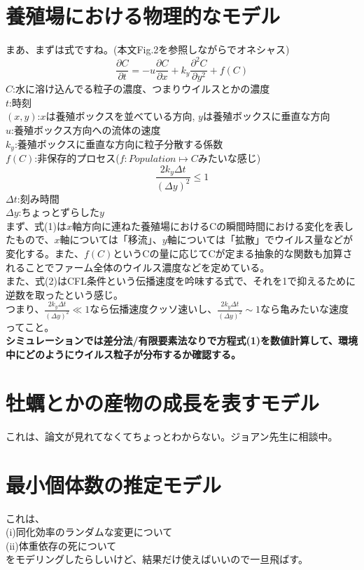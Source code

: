 \documentclass{article}
\begin{document}
\section{養殖場における物理的なモデル}
まあ、まずは式ですね。(本文Fig.2を参照しながらでオネシャス)\\
\begin{equation}
    \frac{\partial C}{\partial t} = -u \frac{\partial C}{\partial x}+k_y\frac{\partial^2 C}{\partial y^2}+f(C)
\end{equation}
$C$:水に溶け込んでる粒子の濃度、つまりウイルスとかの濃度\\
$t$:時刻\\
$(x, y)$:$x$は養殖ボックスを並べている方向, $y$は養殖ボックスに垂直な方向\\
$u$:養殖ボックス方向への流体の速度\\
$k_y$:養殖ボックスに垂直な方向に粒子分散する係数\\
$f(C)$:非保存的プロセス($f:Population\mapsto C$みたいな感じ)\\
\begin{equation}
    \frac{2k_y\Delta t}{(\Delta y)^2}\leq 1
\end{equation}
$\Delta t$:刻み時間\\
$\Delta y$:ちょっとずらした$y$\\
まず、式(1)は$x$軸方向に連ねた養殖場におけるCの瞬間時間における変化を表したもので、$x$軸については「移流」、$y$軸については「拡散」でウイルス量などが変化する。また、$f(C)$というCの量に応じてCが定まる抽象的な関数も加算されることでファーム全体のウイルス濃度などを定めている。\\
また、式(2)はCFL条件という伝播速度を吟味する式で、それを1で抑えるために逆数を取ったという感じ。\\
つまり、$\frac{2k_y\Delta t}{(\Delta y)^2} \ll 1$なら伝播速度クッソ速いし、$\frac{2k_y\Delta t}{(\Delta y)^2} \sim 1$なら亀みたいな速度ってこと。\\
\textbf{シミュレーションでは差分法/有限要素法なりで方程式(1)を数値計算して、環境中にどのようにウイルス粒子が分布するか確認する。}

\section{牡蠣とかの産物の成長を表すモデル}
これは、論文が見れてなくてちょっとわからない。ジョアン先生に相談中。

\section{最小個体数の推定モデル}
これは、\\
(i)同化効率のランダムな変更について\\
(ii)体重依存の死について\\
をモデリングしたらしいけど、結果だけ使えばいいので一旦飛ばす。
\end{document}
